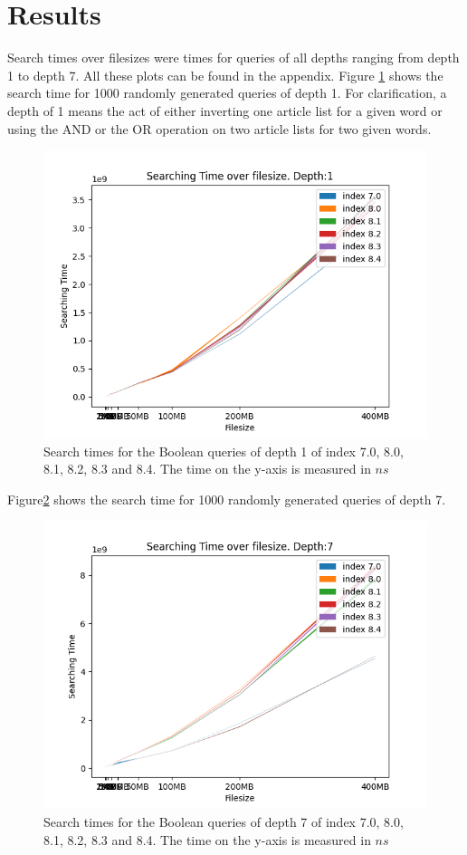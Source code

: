 \section{Results}
Search times over filesizes were times for queries of all depths ranging from depth 1 to depth 7. All these plots can be found in the appendix. Figure \ref{fig:Searchtimebool1} shows the search time for 1000 randomly generated queries of depth 1. For clarification, a depth of 1 means the act of either inverting one article list for a given word or using the AND or the OR operation on two article lists for two given words.

\begin{figure}[ht!]
    \centering
    \includegraphics[width=.8\textwidth]{LaTeX/Pictures/Results/BooleanSearchDepth0.png}
    \caption{Search times for the Boolean queries of depth 1 of index 7.0, 8.0, 8.1, 8.2, 8.3 and 8.4. The time on the y-axis is measured in $ns$}
    \label{fig:Searchtimebool1}
\end{figure}

Figure\ref{fig:Searchtimebool7} shows the search time for 1000 randomly generated queries of depth 7.

\begin{figure}[ht!]
    \centering
    \includegraphics[width=.8\textwidth]{LaTeX/Pictures/Results/BooleanSearchDepth6.png}
    \caption{Search times for the Boolean queries of depth 7 of index 7.0, 8.0, 8.1, 8.2, 8.3 and 8.4. The time on the y-axis is measured in $ns$}
    \label{fig:Searchtimebool7}
\end{figure}

